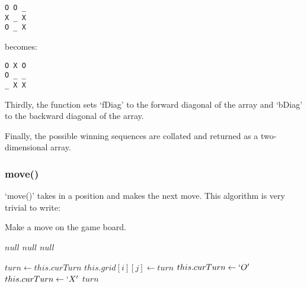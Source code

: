 \documentclass{article}
\begin{document}
\begin{verbatim}
O O _
X _ X
O _ X
\end{verbatim}

becomes:

\begin{verbatim}
O X O
O _ _
_ X X
\end{verbatim}

Thirdly, the function sets `fDiag' to the forward diagonal of the array and `bDiag' to the backward diagonal of the array.

Finally, the possible winning sequences are collated and returned as a two-dimensional array.

\subsubsection{move()}

`move()' takes in a position and makes the next move. This algorithm is very trivial to write:

\begin{algorithm}
\caption{Make a move on the game board.}

\begin{algorithmic}[1]
    \Return $null$
    \Return $null$
    \Return $null$
  \EndIf

  \State $turn \gets this.curTurn$
  \State $this.grid[i][j] \gets turn$
    \State $this.curTurn \gets `O'$
    \State $this.curTurn \gets `X'$
  \EndIf
  \Return $turn$
\EndProcedure
\end{algorithmic}
\end{algorithm}
\end{document}

